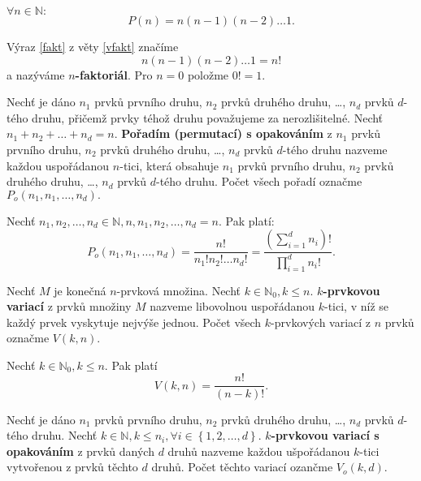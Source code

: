 \begin{veta}\label{vfakt}
    $\forall n \in \mathbb N:$
    \begin{equation}\label{fakt}
   P(n)=n(n-1)(n-2)\dots 1.
    \end{equation}
\end{veta}

\begin{definition}
    Výraz \ref{fakt} z věty \ref{vfakt} značíme
    $$n(n-1)(n-2)\dots 1=n!$$
    a nazýváme \textbf{$n$-faktoriál}. Pro $n=0$ položme $0! =1.$
\end{definition}

\begin{definition}
    Nechť je dáno $n_1$ prvků prvního druhu, $n_2$ prvků druhého druhu, \dots,
    $n_d$ prvků $d$-tého druhu, přičemž prvky téhož druhu považujeme za nerozlišitelné.
    Nechť $n_1+n_2+\dots+n_d=n.$ \textbf{Pořadím (permutací) s opakováním} z  $n_1$
    prvků prvního druhu, $n_2$ prvků druhého druhu, \dots, $n_d$ prvků $d$-tého druhu
    nazveme každou uspořádanou $n$-tici, která obsahuje $n_1$ prvků prvního druhu,
    $n_2$ prvků druhého druhu, \dots, $n_d$ prvků $d$-tého druhu. Počet všech pořadí
    označme $P_o(n_1, n_1, \dots, n_d).$
\end{definition}

\begin{veta}
    Nechť $n_1, n_2, \dots, n_d \in \mathbb N, n, n_1, n_2, \dots, n_d=n.$ Pak platí:
    $$P_o(n_1, n_1, \dots, n_d)=\frac{n!}{n_1!n_2!\dots n_d!}=
    \frac{\left ( \sum_{i=1}^d n_i \right )! }{\prod_{i=1}^d n_i!}.$$
\end{veta}

\begin{definition}
    Nechť $M$ je konečná $n$-prvková množina. Nechť $k \in \mathbb N_0, k\leq n.$
    \textbf{$k$-prvkovou variací} z prvků množiny $M$ nazveme libovolnou
    uspořádanou $k$-tici, v níž se každý prvek vyskytuje nejvýše jednou. Počet
    všech $k$-prvkových variací z $n$ prvků označme $V(k,n).$
\end{definition}

\begin{veta}
    Nechť $k \in \mathbb N_0, k\leq n.$ Pak platí
    $$V(k,n)=\frac{n!}{(n-k)!}.$$
\end{veta}

\begin{definition}
    Nechť je dáno $n_1$ prvků prvního druhu, $n_2$ prvků druhého druhu, \dots,
    $n_d$ prvků $d$-tého druhu. Nechť $k\in \mathbb N, k \leq n_i, \forall
    i \in \left \{ 1, 2, \dots, d \right \} .$ \textbf{$k$-prvkovou variací s
    opakováním} z prvků daných $d$ druhů nazveme každou ušpořádanou $k$-tici
    vytvořenou z prvků těchto $d$ druhů. Počet těchto variací ozančme $V_o(k,d).$
\end{definition}

